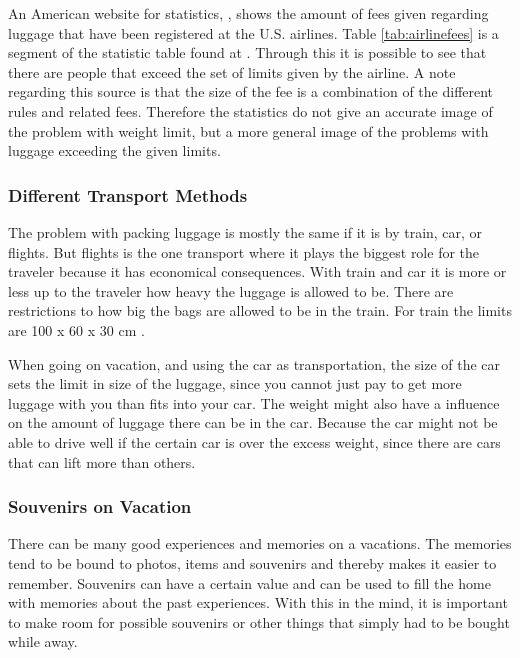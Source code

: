 An American website for statistics, \citep{airstat}, shows the amount of fees given regarding luggage that have been registered at the U.S. airlines. Table \ref{tab:airlinefees} is a segment of the statistic table found at \citep{airstat}. Through this it is possible to see that there are people that exceed the set of limits given by the airline. A note regarding this source is that the size of the fee is a combination of the different rules and related fees. Therefore the statistics do not give an accurate image of the problem with weight limit, but a more general image of the problems with luggage exceeding the given limits.

\subsubsection{Different Transport Methods}
The problem with packing luggage is mostly the same if it is by train, car, or flights. But flights is the one transport where it plays the biggest role for the traveler because it has economical consequences. With train and car it is more or less up to the traveler how heavy the luggage is allowed to be. There are restrictions to how big the bags are allowed to be in the train. For train the limits are 100 x 60 x 30 cm \citep{rulestrain}.

When going on vacation, and using the car as transportation, the size of the car sets the limit in size of the luggage, since you cannot just pay to get more luggage with you than fits into your car. The weight might also have a influence on the amount of luggage there can be in the car. Because the car might not be able to drive well if the certain car is over the excess weight, since there are cars that can lift more than others. %

\subsubsection{Souvenirs on Vacation}
There can be many good experiences and memories on a vacations. The memories tend to be bound to photos, items and souvenirs and thereby makes it easier to remember. Souvenirs can have a certain value and can be used to fill the home with memories about the past experiences.
With this in the mind, it is important to make room for possible souvenirs or other things that simply had to be bought while away.

